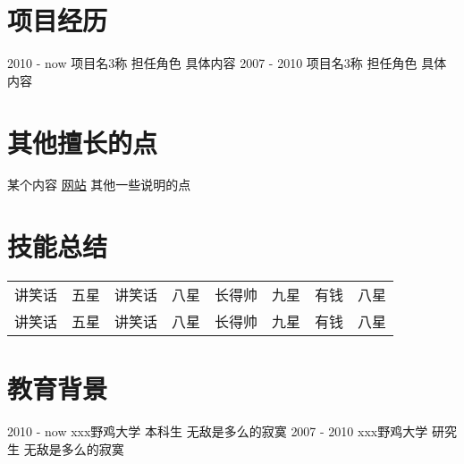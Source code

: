 \documentclass[]{viccuad-cv}
\begin{document}
\section{项目经历}
    \begin{entrylistdated}
      \entrydated
        {2010 - now}
        {项目名3称}
        {担任角色}
        {具体内容}
      \entrydated
        {2007 - 2010}
        {项目名3称}
        {担任角色}
        {具体内容}
    \end{entrylistdated}
\section{其他擅长的点}
    \begin{entrylist}
      \entry
        {某个内容}
        {\href{https://baidu.com}{网站}}
	{其他一些说明的点}
    \end{entrylist}

\framebreak


\section{技能总结}
\providecommand{\tabularnewline}{\\}
\setlength{\tabcolsep}{5pt}
    \begin{tabularx}{\linewidth}{X r | X r | X r | X r}
      讲笑话       &  五星 & 讲笑话       &  八星& 长得帅     & 九星 &  有钱  &  八星\tabularnewline
      讲笑话       &  五星 & 讲笑话       &  八星& 长得帅     & 九星 &  有钱  &  八星
    \end{tabularx}




\section{教育背景}
    \begin{entrylistdated}
      \entrydated
        {2010 - now}
        {xxx野鸡大学}
        {本科生}
        {无敌是多么的寂寞}
      \entrydated
        {2007 - 2010}
        {xxx野鸡大学}
        {研究生}
        {无敌是多么的寂寞}
    \end{entrylistdated}
\end{document}
